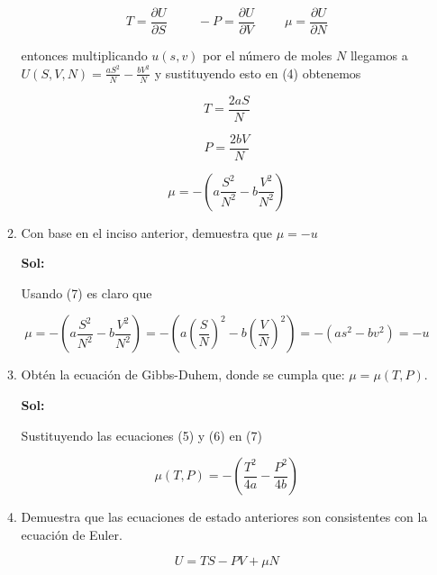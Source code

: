 \documentclass[12pt,a4paper]{article}
\begin{document}
\begin{enumerate}
\begin{enumerate}
    \begin{equation}
        T = \frac{\partial U}{\partial S} \hspace{1cm} -P = \frac{\partial U}{\partial V} \hspace{1cm} \mu = \frac{\partial U}{\partial N}
    \end{equation}
    
    entonces multiplicando $u(s,v)$ por el número de moles $N$ llegamos a $U(S,V,N) = \frac{aS^2}{N} - \frac{b V^2}{N}$ y sustituyendo esto en (4) obtenemos
    
    \begin{equation}
        T = \frac{2aS}{N}   
    \end{equation}
    
    \begin{equation}
        P = \frac{2bV}{N}
    \end{equation}
    
    \begin{equation}
        \mu = - (a\frac{S^2}{N^2} - b \frac{V^2}{N^2})
    \end{equation}
    
    
    
    \item Con base en el inciso anterior, demuestra que $\mu = -u$
    
    \textbf{Sol:}
    
    Usando (7) es claro que
    
    \begin{equation}
        \mu = - (a\frac{S^2}{N^2} - b \frac{V^2}{N^2}) = - (a\left(\frac{S}{N}\right)^2 - b \left(\frac{V}{N}\right)^2) = -(as^2 - bv^2) = -u
    \end{equation}
    
    
    \item Obtén la ecuación de Gibbs-Duhem, donde se cumpla que: $\mu = \mu (T,P)$.
    
    \textbf{Sol:}
    
    Sustituyendo las ecuaciones (5) y (6) en (7)
    
    \begin{equation}
        \mu(T,P) = - \left(\frac{T^2}{4a} - \frac{P^2}{4b} \right)
    \end{equation}
    
    
    \item Demuestra que las ecuaciones de estado anteriores son consistentes con la ecuación de Euler.
    
    \begin{equation*}
        U = TS - PV + \mu N
    \end{equation*}
    

\end{enumerate}
\end{enumerate}
\end{document}
